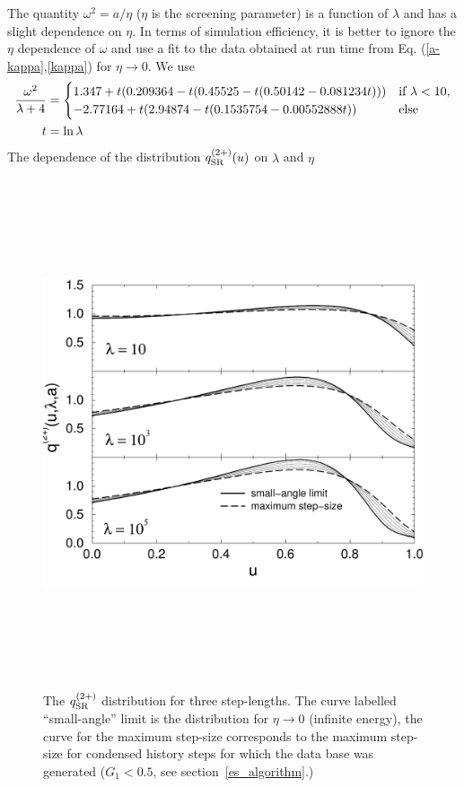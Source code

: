 The quantity $\omega^2 = a/\eta$ ($\eta$ is the screening parameter) 
is a function of $\lambda$ and has a slight dependence 
on $\eta$. In terms of simulation efficiency, it is better to 
ignore the $\eta$ dependence of $\omega$ and use a fit to 
the data obtained  at run time from Eq. (\ref{a-kappa},\ref{kappa}) for 
$\eta \to 0$. We use 
\begin{equation}
\label{fit_omega2}
\begin{split}
{\omega^2 \over \lambda + 4} & = 
\begin{cases}
1.347 + t (0.209364 - t (0.45525 - t (0.50142 - 0.081234 t))) & \text{if}~ 
\lambda < 10, \\
-2.77164 + t (2.94874 - t (0.1535754 - 0.00552888 t)) & \text{else}
\end{cases}
\\
t & = \ln \lambda
\end{split}
\end{equation}
The dependence of the distribution $q^{(2+)}_{\rm SR}(u)$ on 
$\lambda$ and $\eta$ 
\begin{figure}[htp]
\includegraphics[height=15cm,width=15cm]{figures/q2}
\caption[The $q^{(2+)}$ surface]{\label{fig_q2} 
The $q^{(2+)}_{\rm SR}$ distribution for 
three step-lengths. The curve labelled ``small-angle'' limit is 
the distribution for $\eta \to 0$ (infinite energy), the 
curve for the maximum step-size corresponds to the 
maximum step-size for condensed history steps for which the data base was
generated ($G_1 < 0.5$, see section~\ref{es_algorithm}.)}
\end{figure} 
